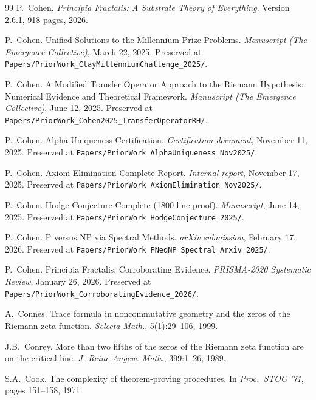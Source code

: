\documentclass[11pt,a4paper]{amsart}
\theoremstyle{plain}
\theoremstyle{definition}
\begin{document}
\begin{thebibliography}{99}
P.~Cohen.
\newblock \emph{Principia Fractalis: A Substrate Theory of Everything}.
\newblock Version 2.6.1, 918 pages, 2026.

P.~Cohen.
\newblock Unified Solutions to the Millennium Prize Problems.
\newblock \emph{Manuscript (The Emergence Collective)}, March 22, 2025. Preserved at \texttt{Papers/PriorWork\_ClayMillenniumChallenge\_2025/}.

P.~Cohen.
\newblock A Modified Transfer Operator Approach to the Riemann Hypothesis: Numerical Evidence and Theoretical Framework.
\newblock \emph{Manuscript (The Emergence Collective)}, June 12, 2025. Preserved at \texttt{Papers/PriorWork\_Cohen2025\_TransferOperatorRH/}.

P.~Cohen.
\newblock Alpha-Uniqueness Certification.
\newblock \emph{Certification document}, November 11, 2025. Preserved at \texttt{Papers/PriorWork\_AlphaUniqueness\_Nov2025/}.

P.~Cohen.
\newblock Axiom Elimination Complete Report.
\newblock \emph{Internal report}, November 17, 2025. Preserved at \texttt{Papers/PriorWork\_AxiomElimination\_Nov2025/}.

P.~Cohen.
\newblock Hodge Conjecture Complete (1800-line proof).
\newblock \emph{Manuscript}, June 14, 2025. Preserved at \texttt{Papers/PriorWork\_HodgeConjecture\_2025/}.

P.~Cohen.
\newblock P versus NP via Spectral Methods.
\newblock \emph{arXiv submission}, February 17, 2026. Preserved at \texttt{Papers/PriorWork\_PNeqNP\_Spectral\_Arxiv\_2025/}.

P.~Cohen.
\newblock Principia Fractalis: Corroborating Evidence.
\newblock \emph{PRISMA-2020 Systematic Review}, January 26, 2026. Preserved at \texttt{Papers/PriorWork\_CorroboratingEvidence\_2026/}.

A.~Connes.
\newblock Trace formula in noncommutative geometry and the zeros of the Riemann zeta function.
\newblock \emph{Selecta Math.}, 5(1):29--106, 1999.

J.B.~Conrey.
\newblock More than two fifths of the zeros of the Riemann zeta function are on the critical line.
\newblock \emph{J. Reine Angew. Math.}, 399:1--26, 1989.

S.A.~Cook.
\newblock The complexity of theorem-proving procedures.
\newblock In \emph{Proc.\ STOC '71}, pages 151--158, 1971.


\end{thebibliography}
\end{document}
